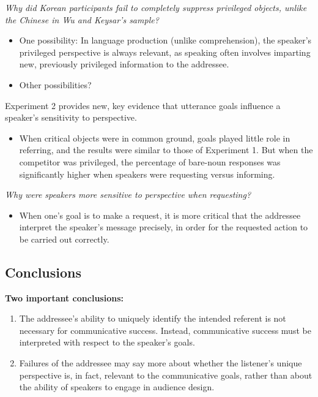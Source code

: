 \documentclass{article}
\begin{document}
\begin{multicols}{2}
\textit{Why did Korean participants fail to completely suppress privileged objects, unlike the Chinese in Wu and Keysar's sample?}
\begin{itemize}
	\item One possibility: In language production (unlike comprehension), the speaker's privileged perspective is always relevant, as speaking often involves imparting new, previously privileged information to the addressee.
	\item Other possibilities?
\end{itemize}
Experiment 2 provides new, key evidence that utterance goals influence a speaker's sensitivity to perspective.
\begin{itemize}
	\item When critical objects were in common ground, goals played little role in referring, and the results were similar to those of Experiment 1. But when the competitor was privileged, the percentage of bare-noun responses was significantly higher when speakers were requesting versus informing.
\end{itemize}
\textit{Why were speakers more sensitive to perspective when requesting?}
\begin{itemize}
	\item When one's goal is to make a request, it is more critical that the addressee interpret the speaker's message precisely, in order for the requested action to be carried out correctly.
\end{itemize}
\subsection{Conclusions}
\textbf{Two important conclusions:}
\begin{enumerate}
	\item The addressee's ability to uniquely identify the intended referent is not necessary for communicative success. Instead, communicative success must be interpreted with respect to the speaker's goals.
	\item Failures of the addressee may say more about whether the listener's unique perspective is, in fact, relevant to the communicative goals, rather than about the ability of speakers to engage in audience design.
\end{enumerate}
\end{multicols}
\end{document}
